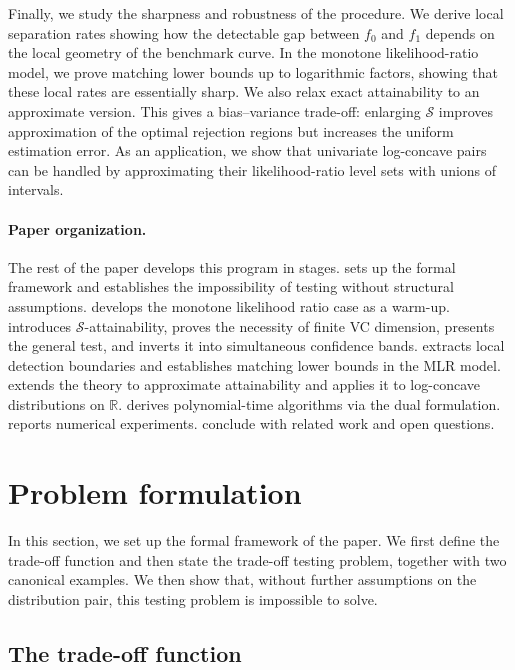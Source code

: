 \documentclass[english]{article}
\theoremstyle{plain}
\theoremstyle{definition}
\begin{document}
Finally, we study the sharpness and robustness of the procedure.
We derive
local separation rates showing how the detectable gap between \(f_0\) and
\(f_1\) depends on the local geometry of the benchmark curve. In the monotone
likelihood-ratio model, we prove matching lower bounds up to logarithmic
factors, showing that these local rates are essentially sharp. We also 
relax exact attainability to an approximate version. This gives a
bias--variance trade-off: enlarging \(\mathcal S\) improves approximation of
the optimal rejection regions but increases the uniform estimation error. As an
application, we show that univariate log-concave pairs can be handled by
approximating their likelihood-ratio level sets with unions of intervals.

\paragraph{Paper organization.}
The rest of the paper develops this program in stages.  sets up the formal framework and establishes the impossibility of testing without structural assumptions.  develops the monotone likelihood ratio case as a warm-up.  introduces \(\mathcal S\)-attainability, proves the necessity of finite VC dimension, presents the general test, and inverts it into simultaneous confidence bands.  extracts local detection boundaries and establishes matching lower bounds in the MLR model.  extends the theory to approximate attainability and applies it to log-concave distributions on \(\mathbb R\).  derives polynomial-time algorithms via the dual formulation.  reports numerical experiments.  conclude with related work and open questions.


\section{Problem formulation}\label{sec:formulation}

In this section, we set up the formal framework of the paper. We first define the trade-off function and then state the trade-off testing
problem, together with two canonical examples. We then show that, without
further assumptions on the distribution pair, this testing problem is impossible
to solve. 

\subsection{The trade-off function}
\end{document}
